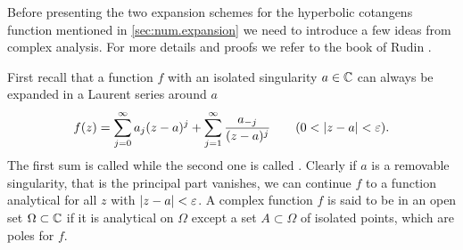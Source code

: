 Before presenting the two expansion schemes for the hyperbolic cotangens function mentioned in \autoref{sec:num.expansion} we need to introduce a few ideas from complex analysis.
For more details and proofs we refer to the book of Rudin \cite{Ru87_analysis}.

First recall that a function $f$ with an isolated singularity $a\in\mathbb{C}$ can always be expanded in a Laurent series around $a$
\begin{equation}
  f(z) = \sum_{j=0}^\infty a_j (z - a)^j + \sum_{j=1}^\infty \frac{a_{-j}}{(z-a)^j} \qquad (0 < \left\vert z-a \right\vert < \varepsilon).
  \label{eq:coth.laurent}
\end{equation}
The first sum is called  while the second one is called .
Clearly if $a$ is a removable singularity, that is the principal part vanishes, we can continue $f$ to a function analytical for all $z$ with $\left\vert z-a \right\vert < \varepsilon$.
A complex function $f$ is said to be  in an open set $\Omega\subset\mathbb{C}$ if it is analytical on $\Omega$ except a set $A \subset\Omega$ of isolated points, which are poles for $f$.

